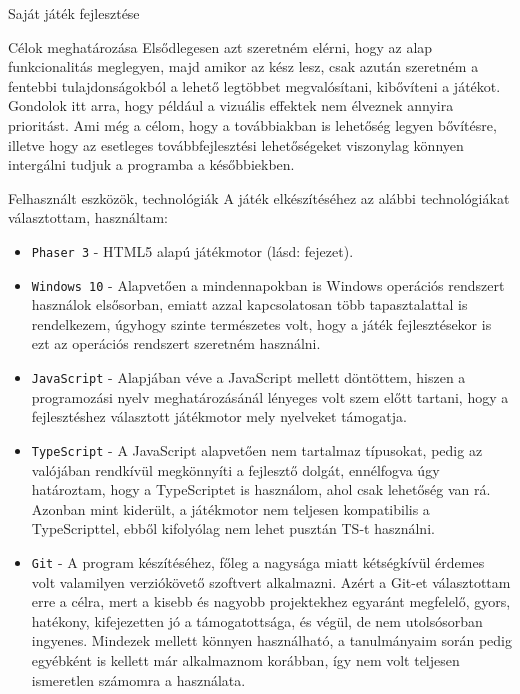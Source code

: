 \begin{MyChapter}{Saját játék fejlesztése}
\begin{MySection}{Célok meghatározása}
		Elsődlegesen azt szeretném elérni, hogy az alap funkcionalitás meglegyen, majd amikor az kész lesz, csak azután szeretném a fentebbi tulajdonságokból a lehető legtöbbet megvalósítani, kibővíteni a játékot. Gondolok itt arra, hogy például a vizuális effektek nem élveznek annyira prioritást. Ami még a célom, hogy a továbbiakban is lehetőség legyen bővítésre, illetve hogy az esetleges továbbfejlesztési lehetőségeket viszonylag könnyen intergálni tudjuk a programba a későbbiekben.
	\end{MySection}
		
	\begin{MySection}{Felhasznált eszközök, technológiák}
		A játék elkészítéséhez az alábbi technológiákat választottam, használtam:
		
		\begin{itemize}
			\item \texttt{Phaser 3} - HTML5 alapú játékmotor (lásd:  fejezet).
			
			\item \texttt{Windows 10} - Alapvetően a mindennapokban is Windows operációs rendszert használok elsősorban, emiatt azzal kapcsolatosan több tapasztalattal is rendelkezem, úgyhogy szinte természetes volt, hogy a játék fejlesztésekor is ezt az operációs rendszert szeretném használni.
			
			\item \texttt{JavaScript} - Alapjában véve a JavaScript mellett döntöttem, hiszen a programozási nyelv meghatározásánál lényeges volt szem előtt tartani, hogy a fejlesztéshez választott játékmotor mely nyelveket támogatja.
			
			\item \texttt{TypeScript} - A JavaScript alapvetően nem tartalmaz típusokat, pedig az valójában rendkívül megkönnyíti a fejlesztő dolgát, ennélfogva úgy határoztam, hogy a TypeScriptet is használom, ahol csak lehetőség van rá. Azonban mint kiderült, a játékmotor nem teljesen kompatibilis a TypeScripttel, ebből kifolyólag nem lehet pusztán TS-t használni.
			
			\item \texttt{Git} - A program készítéséhez, főleg a nagysága miatt kétségkívül érdemes volt valamilyen verziókövető szoftvert alkalmazni. Azért a Git-et választottam erre a célra, mert a kisebb és nagyobb projektekhez egyaránt megfelelő, gyors, hatékony, kifejezetten jó a támogatottsága, és végül, de nem utolsósorban ingyenes. Mindezek mellett könnyen használható, a tanulmányaim során pedig egyébként is kellett már alkalmaznom korábban, így nem volt teljesen ismeretlen számomra a használata.
			

\end{itemize}
\end{MySection}
\end{MyChapter}
